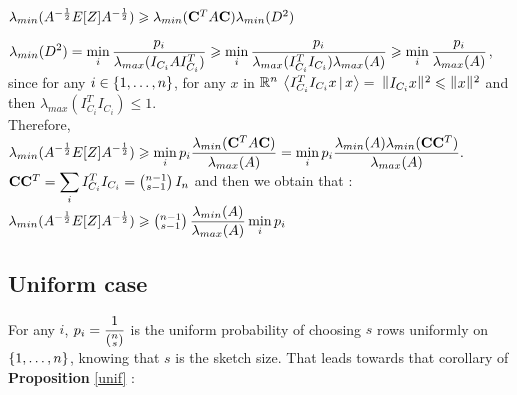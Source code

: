 $\lambda_{min}(A^{-\frac12}E[Z]A^{-\frac12} ) \geq \lambda_{min}(\bold{C}^{T}A \bold{C} ) \lambda_{min}(D^{2})$

$\dsp \lambda_{min}(D^{2}) =  \min_{i}  \frac{p_{i}}{\lambda_{max}(I_{C_{i}} A I_{C_{i}}^{T} ) } \geq  \min_{i}\frac{p_{i} }{\lambda_{max}(I_{C_{i}}^{T} I_{C_{i}}) \lambda_{max}(A)}  \geq \min_{i}\frac{ p_{i} }{\lambda_{max}(A)} $, 
since for any $i\in \acco{1,\dots,n}$, for any $x$ in $\R^{n}$ 
$\scal{I_{C_{i}}^{T} I_{C_{i}} x }{x} =$
$ \norm{ I_{C_{i}}x }^{2} \leq \norm{x}^{2}$
 and then $\lambda_{max}( I_{C_{i}}^{T} I_{C_{i}}  ) \leq 1$.\\
 
 Therefore, 
$\dsp \lambda_{min}(A^{-\frac12}E[Z]A^{-\frac12} ) \geq  \min_{i} p_{i} \frac{\lambda_{min}(\bold{C}^{T}A \bold{C} )}{\lambda_{max}(A)}  =  \min_{i} p_{i} \frac{ \lambda_{min}(A) \lambda_{min}(\bold{C} \bold{C}^{T} )}{\lambda_{max}(A)}.$\\

$\bold{C} \bold{C}^{T}= \dsp\sum\limits_{i} I_{C_{i}}^{T} I_{C_{i}} = \pare{\substack{n-1 \\ s-1}} I_{n} $ and then we obtain that :\\ 


$\dsp \lambda_{min}(A^{-\frac12}E[Z]A^{-\frac12} )  \geq  \dsp \pare{\substack{n-1 \\ s-1}}\frac{\lambda_{min}(A)}{\lambda_{max}(A)}\min_{i} p_{i} $


\subsection{Uniform case}

For any $i$, $p_{i} = \dsp\frac{1}{\pare{\substack{ n \\ s }}}$ is the uniform probability of choosing $s$ rows uniformly on $\acco{1,\dots,n}$, knowing that $s$ is the sketch size. That leads towards that corollary of \textbf{Proposition} \ref{unif} :\\


 
